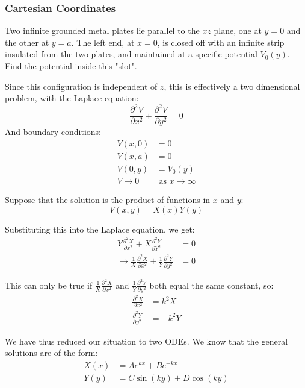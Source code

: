 \documentclass{article}
\begin{document}
\subsubsection{Cartesian Coordinates}
\begin{eg}
    Two infinite grounded metal plates lie parallel to the \(xz\) plane, one at \(y=0\) and the other at \(y=a\). The left end, at \(x=0\), is closed off with an infinite strip insulated 
    from the two plates, and maintained at a specific potential \(V_0(y)\). Find the potential inside this "slot".     
\end{eg}
\begin{answer}
    Since this configuration is independent of \(z\), this is effectively a two dimensional problem, with the Laplace equation:
    \[
        \frac{\partial^2 V}{\partial x^2}+\frac{\partial^2 V}{\partial y^2}=0
    \] 
    And boundary conditions:
    \begin{align*}
        V(x, 0)&=0 \\
        V(x, a)&=0 \\
        V(0,y)&=V_0(y) \\
        V\to 0 &\text{ as } x\to \infty 
    \end{align*}

    Suppose that the solution is the product of functions in \(x\) and \(y\):
    \[
        V(x,y)=X(x)Y(y)
    \]

    Substituting this into the Laplace equation, we get:
    \begin{align*}
        Y\frac{\partial^2 X}{\partial x^2}+X \frac{\partial^2 Y}{\partial Y^2}&=0 \\ 
        \rightarrow \frac{1}{X}\frac{\partial^2 X}{\partial x^2}+\frac{1}{Y}\frac{\partial^2 Y}{\partial y^2}&=0
    \end{align*}

    This can only be true if \(\frac{1}{X}\frac{\partial^2 X}{\partial x^2}\) and \(\frac{1}{Y}\frac{\partial^2 Y}{\partial y^2}\) both equal the same constant, so:
    \begin{align*}
        \frac{\partial^2 X}{\partial x^2}&=k^2X \\
        \frac{\partial^2 Y}{\partial y^2}&=-k^2Y
    \end{align*}

    We have thus reduced our situation to two ODEs. We know that the general solutions are of the form:
    \begin{align*}
        X(x)&=Ae^{kx}+Be^{-kx} \\
        Y(y)&=C\sin(ky)+D\cos(ky)
    \end{align*}
    

\end{answer}
\end{document}
